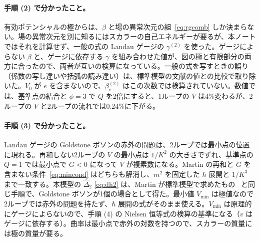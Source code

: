 \documentclass[a4paper,10pt]{ltjsarticle}
\begin{document}
\paragraph{手順 (2) で分かったこと。}有効ポテンシャルの極からは、$\beta$ と場の異常次元の組~\eqref{eq:rgcomb} しか決まらない。場の異常次元を別に知るにはスカラーの自己エネルギーが要るが、本ノートではそれを計算せず、一般の式の Landau ゲージの $\gamma^{(2)}$ を使った。ゲージによらない $\beta$ と、ゲージに依存する $\gamma$ を組み合わせた値が、図の極と有限部分の両方に合ったので、両者が互いの検算になっている。一般の式を写すときの誤り（係数の写し違いや括弧の読み違い）は、標準模型の文献の値との比較で取り除いた。$V_0$ が $e$ を含まないので、$\beta_e^{(2)}$ はこの次数では検算されていない。数値では、基準点の結合と $\phi=3$ で $Q$ を2倍にすると、1ループの $V$ は4\%変わるが、2ループの $V$ と2ループの流れでは0.24\%に下がる。

\paragraph{手順 (3) で分かったこと。}Landau ゲージの Goldstone ボソンの赤外の問題は、2ループでは最小点の位置に現れる。再和しない2ループの $V$ の最小点は $1/K^2$ の大きさでずれ、基準点の $Q=1$ では最小点で $G<0$ になって $V$ が複素数になる。Martin の再和と $G$ を含まない条件~\eqref{eq:mincond} はどちらも解消し、$m^2$ を固定した $\hbar$ 展開と $1/K^3$ まで一致する。本模型の $\hat\Delta_2$ \eqref{eq:dh2} は、Martin が標準模型で求めたもの~\cite{martin14} と同じ手順で、Goldstone ボソンが1個の場合として得た。最小値 $V_{\min}$ は極値なので2ループでは赤外の問題を持たず、$\hbar$ 展開の式がそのまま使える。$V_{\min}$ は原理的にゲージによらないので、手順 (4) の Nielsen 恒等式の検算の基準になる（$v$ はゲージに依存する）。曲率は最小点で赤外の対数を持つので、スカラーの質量には極の質量が要る。
\end{document}
